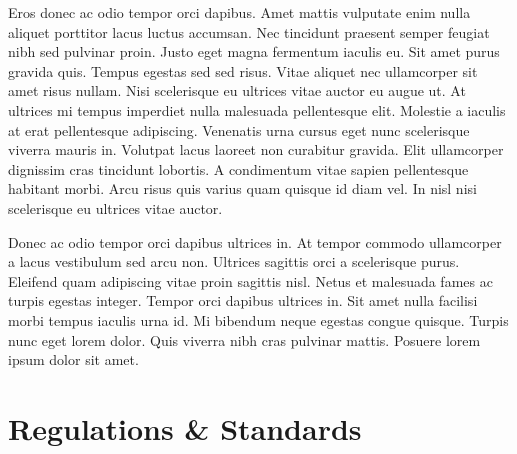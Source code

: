 Eros donec ac odio tempor orci dapibus. Amet mattis vulputate enim nulla aliquet porttitor lacus luctus accumsan. Nec tincidunt praesent semper feugiat nibh sed pulvinar proin. Justo eget magna fermentum iaculis eu. Sit amet purus gravida quis. Tempus egestas sed sed risus. Vitae aliquet nec ullamcorper sit amet risus nullam. Nisi scelerisque eu ultrices vitae auctor eu augue ut. At ultrices mi tempus imperdiet nulla malesuada pellentesque elit. Molestie a iaculis at erat pellentesque adipiscing. Venenatis urna cursus eget nunc scelerisque viverra mauris in. Volutpat lacus laoreet non curabitur gravida. Elit ullamcorper dignissim cras tincidunt lobortis. A condimentum vitae sapien pellentesque habitant morbi. Arcu risus quis varius quam quisque id diam vel. In nisl nisi scelerisque eu ultrices vitae auctor.

Donec ac odio tempor orci dapibus ultrices in. At tempor commodo ullamcorper a lacus vestibulum sed arcu non. Ultrices sagittis orci a scelerisque purus. Eleifend quam adipiscing vitae proin sagittis nisl. Netus et malesuada fames ac turpis egestas integer. Tempor orci dapibus ultrices in. Sit amet nulla facilisi morbi tempus iaculis urna id. Mi bibendum neque egestas congue quisque. Turpis nunc eget lorem dolor. Quis viverra nibh cras pulvinar mattis. Posuere lorem ipsum dolor sit amet.
\section{Regulations \& Standards}

